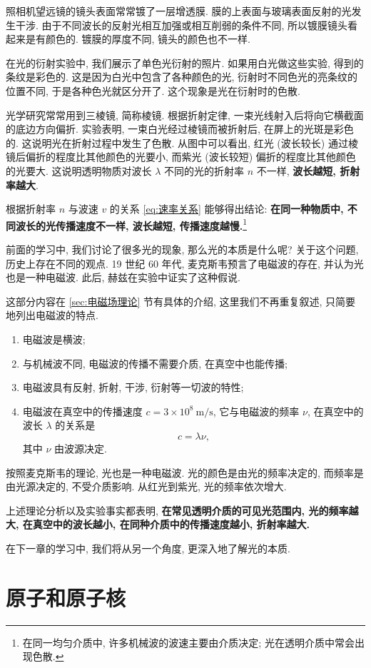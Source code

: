 \documentclass[UTF8,openany,fontset=fandol]{ctexbook}
\theoremstyle{chinesetextbook}
\newcommand{\unit}[1]{\ \mathrm{#1}}
\begin{document}
照相机望远镜的镜头表面常常镀了一层增透膜. 膜的上表面与玻璃表面反射的光发生干涉. 由于不同波长的反射光相互加强或相互削弱的条件不同, 所以镀膜镜头看起来是有颜色的. 镀膜的厚度不同, 镜头的颜色也不一样.

在光的衍射实验中, 我们展示了单色光衍射的照片. 如果用白光做这些实验, 得到的条纹是彩色的. 这是因为白光中包含了各种颜色的光, 衍射时不同色光的亮条纹的位置不同, 于是各种色光就区分开了. 这个现象是光在衍射时的色散.

光学研究常常用到三棱镜, 简称棱镜. 根据折射定律, 一束光线射入后将向它横截面的底边方向偏折. 实验表明, 一束白光经过棱镜而被折射后, 在屏上的光斑是彩色的. 这说明光在折射过程中发生了色散. 从图中可以看出, 红光 (波长较长) 通过棱镜后偏折的程度比其他颜色的光要小, 而紫光 (波长较短) 偏折的程度比其他颜色的光要大. 这说明透明物质对波长 $\lambda$ 不同的光的折射率 $n$ 不一样, \textbf{波长越短, 折射率越大}.

根据折射率 $n$ 与波速 $v$ 的关系 \eqref{eq:速率关系} 能够得出结论: \textbf{在同一种物质中, 不同波长的光传播速度不一样, 波长越短, 传播速度越慢.}\footnote{在同一均匀介质中, 许多机械波的波速主要由介质决定; 光在透明介质中常会出现色散.}

前面的学习中, 我们讨论了很多光的现象, 那么光的本质是什么呢? 关于这个问题, 历史上存在不同的观点. 19 世纪 60 年代, 麦克斯韦预言了电磁波的存在, 并认为光也是一种电磁波. 此后, 赫兹在实验中证实了这种假说.

这部分内容在 \ref{sec:电磁场理论} 节有具体的介绍, 这里我们不再重复叙述, 只简要地列出电磁波的特点.
\begin{enumerate}
\item 电磁波是横波;
\item 与机械波不同, 电磁波的传播不需要介质, 在真空中也能传播;
\item 电磁波具有反射, 折射, 干涉, 衍射等一切波的特性;
\item 电磁波在真空中的传播速度 $c=3\times 10^8\unit{m/s}$, 它与电磁波的频率 $\nu$, 在真空中的波长 $\lambda$ 的关系是
\[
c=\lambda\nu,
\]
其中 $\nu$ 由波源决定.
\end{enumerate}

按照麦克斯韦的理论, 光也是一种电磁波. 光的颜色是由光的频率决定的, 而频率是由光源决定的, 不受介质影响. 从红光到紫光, 光的频率依次增大.

上述理论分析以及实验事实都表明, \textbf{在常见透明介质的可见光范围内, 光的频率越大, 在真空中的波长越小, 在同种介质中的传播速度越小, 折射率越大.}

在下一章的学习中, 我们将从另一个角度, 更深入地了解光的本质.
\part{原子和原子核}
\end{document}
